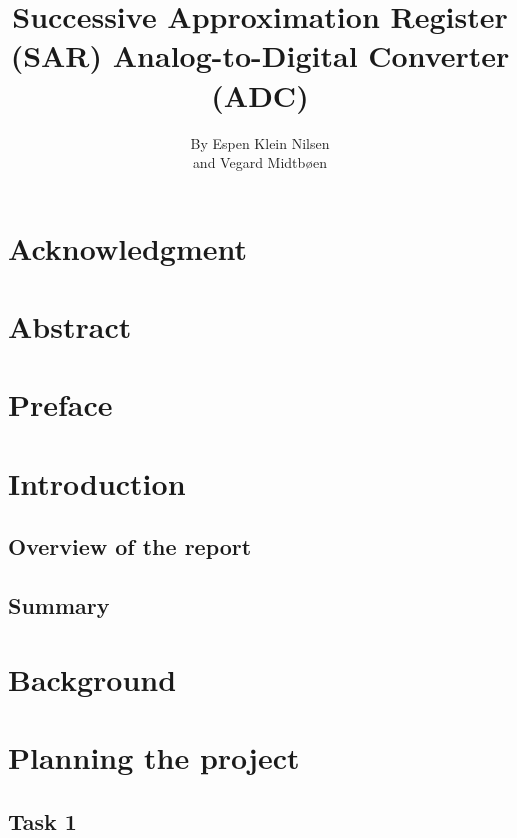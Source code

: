 \documentclass[english, 12pt, a4paper]{ifimaster}
\title{ \huge{Successive Approximation Register (SAR) Analog-to-Digital Converter (ADC)}}
\author{By Espen Klein Nilsen\\ and Vegard Midtbøen}
\begin{document}
\ififorside{}
\frontmatter{}
\maketitle{}
\chapter*{Acknowledgment}

\chapter*{Abstract}

\tableofcontents{}
\listoffigures{}
\listoftables{}

\chapter*{Preface}


\mainmatter{}        

\chapter{Introduction}         

\section{Overview of the report}

\section{Summary}

\chapter{Background}


\chapter{Planning the project} 
\section{Task 1}
\end{document}
